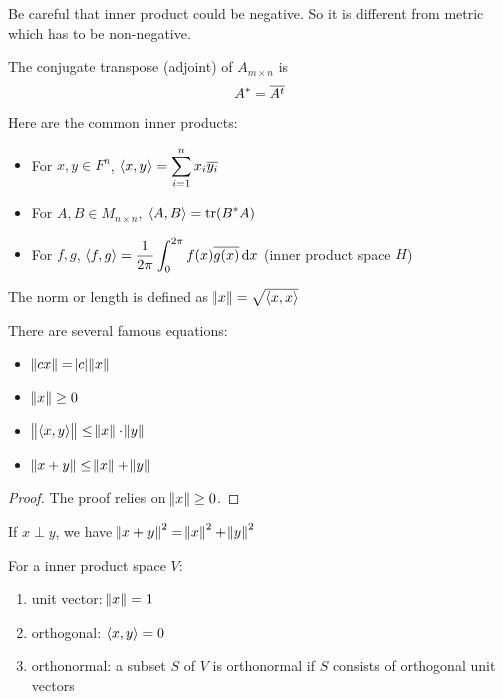 Be careful that inner product could be negative. So it is different from metric which has to be non-negative.

\begin{definition}
    The conjugate transpose (adjoint) of $A_{m \times n}$ is 
    \begin{equation}
        A^* = \overline{A^t}
    \end{equation}
\end{definition}

Here are the common inner products:
\begin{itemize}
    \item For $x,y \in F^n$, $\displaystyle \left\langle \displaystyle x, y \right\rangle = \sum_{i=1}^n x_i \overline{y_i}$
    \item For $A,B \in M_{n \times n}$, $\left\langle \displaystyle A, B \right\rangle = \displaystyle \text{tr}( B^* A )$
    \item For $f,g$, $\displaystyle \innerproduct{f}{g} = \frac{1}{2 \pi} \int_{0}^{2\pi} f(x) \conjugate{g(x)} \dif x$ (inner product space $H$)
\end{itemize}


The norm or length is defined as $\norm{x} = \sqrt{\left\langle \displaystyle x, x \right\rangle}$

There are several famous equations:
\begin{itemize}
    \item $\norm{cx} = \abs{c} \norm{x}$
    \item $\norm{x} \geq 0$
    \item $\norm{\left\langle \displaystyle x, y \right\rangle} \leq \norm{x} \cdot \norm{y}$
    \item $\norm{x+y} \leq \norm{x} + \norm{y}$
\end{itemize}
\begin{proof}
    The proof relies on $\norm{x} \geq 0$.
\end{proof}


If $x \perp y$, we have $\norm{x+y}^2 = \norm{x}^2 + \norm{y}^2$


\begin{definition}
    For a inner product space $V$:
    \begin{enumerate}
        \item unit vector: $\norm{x} =1$
        \item orthogonal: $\left\langle \displaystyle x, y \right\rangle = 0$
        \item orthonormal: a subset $S$ of $V$ is orthonormal if $S$ consists of orthogonal unit vectors
    \end{enumerate}
\end{definition}

